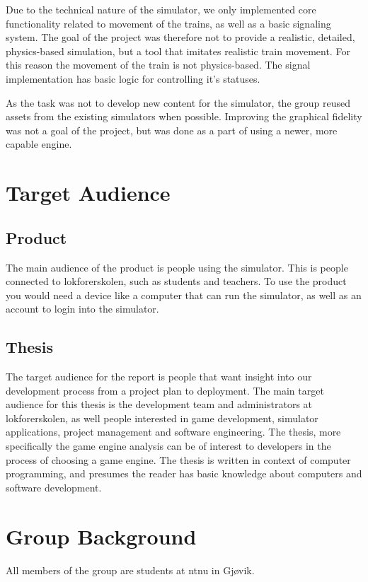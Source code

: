 Due to the technical nature of the simulator, we only implemented core functionality related to movement of the trains, as well as a basic signaling system. The goal of the project was therefore not to provide a realistic, detailed, physics-based simulation, but a tool that imitates realistic train movement. For this reason the movement of the train is not physics-based. The signal implementation has basic logic for controlling it's statuses.  

As the task was not to develop new content for the simulator, the group reused assets from the existing simulators when possible. Improving the graphical fidelity was not a goal of the project, but was done as a part of using a newer, more capable engine. 

\section{Target Audience}

\subsection{Product}
The main audience of the product is people using the simulator. This is people connected to \Gls{lokforerskolen}, such as students and teachers. To use the product you would need a device like a computer that can run the simulator, as well as an account to login into the simulator. 

\subsection{Thesis}

The target audience for the report is people that want insight into our development process from a project plan to deployment. The main target audience for this thesis is the development team and administrators at \Gls{lokforerskolen}, as well people interested in game development, simulator applications, project management and software engineering. The thesis, more specifically the game engine analysis can be of interest to developers in the process of choosing a game engine. The thesis is written in context of computer programming, and presumes the reader has basic knowledge about computers and software development. 

\section{Group Background}
All members of the group are students at \acrshort{ntnu} in Gjøvik. 

